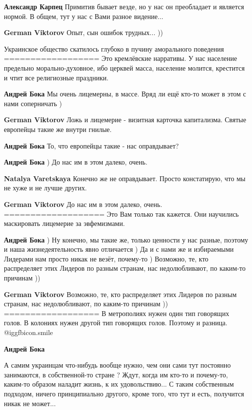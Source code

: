 \begin{itemize}
\begin{itemize}
\textbf{Александр Карпец} Примитив бывает везде, но у нас он преобладает и является нормой. В общем, тут у нас с Вами разное видение...

\textbf{German Viktorov} Опыт, сын ошибок трудных... ))
\end{itemize} %

Украинское общество скатилось глубоко в пучину аморального поведения
==================
Это кремлёвские нарративы.  У нас население предельно морально-духовное, ибо
церквей масса, население молится, крестится и чтит все религиозные праздники.

\begin{itemize} %
\textbf{Андрей Бока} Мы очень лицемерны, в массе. Вряд ли ещё кто-то может в этом с нами соперничать )

\textbf{German Viktorov} Ложь и лицемерие - визитная карточка капитализма.
Святые европейцы такие же внутри гнилые.

\textbf{Андрей Бока} То, что европейцы такие - нас оправдывает?

\textbf{Андрей Бока} ) До нас им в этом далеко, очень.

\textbf{Natalya Varetskaya} Конечно же не оправдывает.
Просто констатирую, что мы не хуже и не лучше других.

\textbf{German Viktorov} До нас им в этом далеко, очень.
===================
Это Вам только так кажется.
Они научились маскировать лицемерие за эвфемизмами.

\textbf{Андрей Бока} ) Ну конечно, мы такие же, только ценности у нас разные, поэтому и наша жизнедеятельность явно отличается ) Да и с нами же и избираемыми Лидерами нам просто никак не везёт, почему-то ) Возможно, те, кто распределяет этих Лидеров по разным странам, нас недолюбливают, по каким-то причинам ))

\textbf{German Viktorov} Возможно, те, кто распределяет этих Лидеров по разным странам, нас недолюбливают, по каким-то причинам ))
==================
В метрополиях нужен один тип говорящих голов.
В колониях нужен другой тип говорящих голов.
Поэтому и разница.
 @igg{fbicon.smile} 

\textbf{Андрей Бока} 

А самим украинцам что-нибудь вообще нужно, чем они сами тут постоянно
занимаются, в собственной-то стране ? Ждут, когда им кто-то и почему-то,
каким-то образом наладит жизнь, к их удовольствию... С таким собственным
подходом, ничего принципиально другого, кроме того, что тут и есть, получится
никак не может...



\end{itemize}
\end{itemize}

